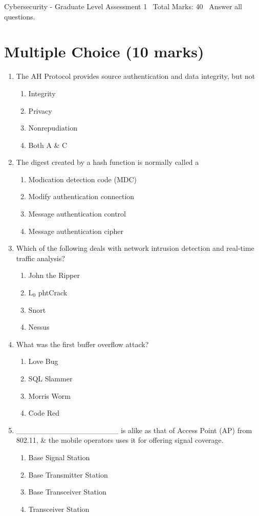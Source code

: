 \documentclass[12pt]{article}
\begin{document}
\begin{center}
Cybersecurity - Graduate Level Assessment 1 \
Total Marks: 40 \
Answer all questions.
\end{center}

\section*{Multiple Choice (10 marks)}
\begin{enumerate}[label=\arabic*.]
\item The AH Protocol provides source authentication and data integrity, but not
\begin{enumerate}[label=(\alph*)]
    \item Integrity
    \item Privacy
    \item Nonrepudiation
    \item Both A \& C
\end{enumerate}
\item The digest created by a hash function is normally called a
\begin{enumerate}[label=(\alph*)]
    \item Modication detection code (MDC)
    \item Modify authentication connection
    \item Message authentication control
    \item Message authentication cipher
\end{enumerate}
\item Which of the following deals with network intrusion detection and real-time traffic analysis?
\begin{enumerate}[label=(\alph*)]
    \item John the Ripper
    \item L$_{0}$ phtCrack
    \item Snort
    \item Nessus
\end{enumerate}
\item What was the first buffer overflow attack?
\begin{enumerate}[label=(\alph*)]
    \item Love Bug
    \item SQL Slammer
    \item Morris Worm
    \item Code Red
\end{enumerate}
\item \_\_\_\_\_\_\_\_\_\_\_\_\_\_\_\_\_\_\_ is alike as that of Access Point (AP) from 802.11, \& the mobile operators uses it for offering signal coverage.
\begin{enumerate}[label=(\alph*)]
    \item Base Signal Station
    \item Base Transmitter Station
    \item Base Transceiver Station
    \item Transceiver Station
\end{enumerate}
\end{enumerate}
\end{document}
